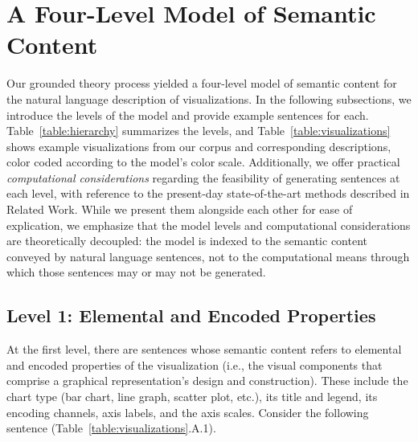 \section{A Four-Level Model of Semantic Content}
\label{section:4}



Our grounded theory process yielded a four-level model of semantic content for the natural language description of visualizations. 
In the following subsections, we introduce the levels of the model and provide example sentences for each.
Table~\ref{table:hierarchy} summarizes the levels, and Table~\ref{table:visualizations} shows example visualizations from our corpus and corresponding descriptions, color coded according to the model's color scale.
Additionally, we offer practical \emph{computational considerations} regarding the feasibility of generating sentences at each level, with reference to the present-day state-of-the-art methods described in Related Work.
While we present them alongside each other for ease of explication, we emphasize that the model levels and computational considerations are theoretically decoupled: the model is indexed to the {semantic content} conveyed by natural language sentences, not to the {computational means} through which those sentences may or may not be generated.

\subsection{Level 1: Elemental and Encoded Properties}
\label{sec:level1}

At the first level, there are sentences whose semantic content refers to elemental and encoded properties of the visualization (i.e., the visual components that comprise a graphical representation's design and construction).
These include the chart type (bar chart, line graph, scatter plot, etc.), its title and legend, its encoding channels, axis labels, and the axis scales. Consider the following sentence (Table~\ref{table:visualizations}.A.1).

\begin{quote}
    \vspace{-1mm}
    \small
    \vspace{-1mm}
\end{quote}

